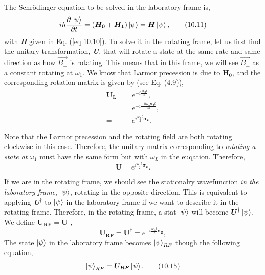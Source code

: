 \documentclass{article}
\newcommand{\bfit}[1]{\textit{\textbf{#1}}}
\begin{document}
The Schr\"{o}dinger equation to be solved in the laboratory frame is,
\begin{equation}\label{eq 10.11}
    i\hbar\frac{\partial \ket{\psi}}{\partial t}=(\boldsymbol{H_0}+\boldsymbol{H_1})\ket{\psi}=\boldsymbol{H}\ket{\psi},\tag{10.11}
\end{equation}
with \bfit{H} given in Eq. (\ref{eq 10.10}). To solve it in the rotating frame, let us first find the
unitary transformation, \bfit{U}, that will rotate a state at the same rate and same direction as how 
$\vec{B_\bot}$ is rotating. This means that in this frame, we will see $\vec{B_\bot}$ as a constant rotating at 
$\omega_1$. We know that Larmor precession is due to $\boldsymbol{H_0}$, and the corresponding rotation matrix is given
by (see Eq. (4.9)),
\begin{align*}\label{eq 10.12}
    \boldsymbol{U_L}=&e^{-i\frac{\boldsymbol{H_0}t}{\hbar}},\\
    =&e^{-i\frac{-\hbar\omega_L\boldsymbol{\sigma_z}t}{2\hbar}},\\
    =&e^{i\frac{\omega_Lt}{2}\boldsymbol{\sigma_z}}.\tag{10.12}
\end{align*}

Note that the Larmor precession and the rotating field are both rotating clockwise
in this case. Therefore, the unitary matrix corresponding to \textit{rotating a state at}
$\omega_1$ must have the same form but with $\omega_L$ in the euqation. Therefore,
\begin{equation}\label{eq 10.13}
    \boldsymbol{U}=e^{i\frac{\omega_1t}{2}\boldsymbol{\sigma_z}}.\tag{10.13}
\end{equation}

If we are in the rotating frame, we should see the stationalry wavefunction \textit{in the laboratory
frame}, $\ket{\psi}$, rotating in the opposite direction. This is equivalent to applying
\bfit{U}$^\dagger$ to $\ket{\psi}$ in the laboratory frame if we want to describe it in the rotating
frame. Therefore, in the rotating frame, a stat $\ket{\psi}$ will become $\boldsymbol{U}^\dagger\ket{\psi}$.
We define $\boldsymbol{U_{RF}}=\boldsymbol{U}^\dagger$,
\begin{equation}\label{eq 10.14}
    \boldsymbol{U_{R F}}=\boldsymbol{U}^\dagger=e^{-i\frac{\omega_Lt}{2}\boldsymbol{\sigma_z}},\tag{10.14}
\end{equation}
The state $\ket{\psi}$ in the laboratory frame becomes $\ket{\psi}_{RF}$
though the following equation,
\begin{equation}\label{eq 10.15}
    \ket{\psi}_{RF}=\boldsymbol{U_{RF}}\ket{\psi}.\tag{10.15}
\end{equation}
\end{document}
